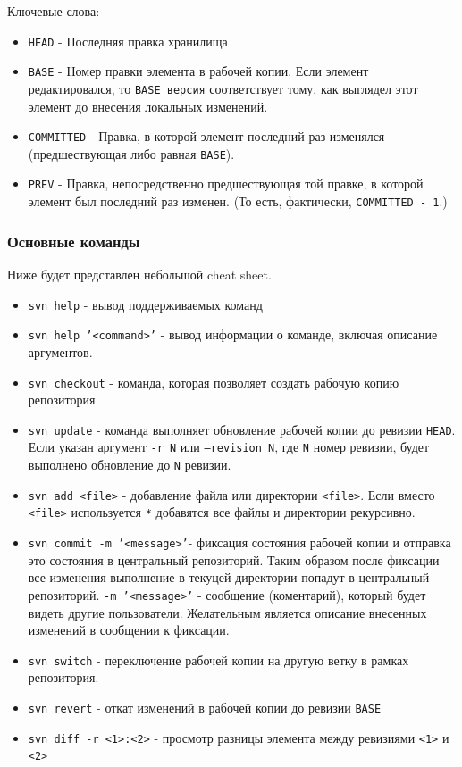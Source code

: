 \documentclass[a4paper,12pt]{article}
\begin{document}
Ключевые слова:

\begin{itemize}
\item
  \texttt{HEAD} - Последняя правка хранилища
\item
  \texttt{BASE} - Номер правки элемента в рабочей копии. Если элемент
  редактировался, то \texttt{BASE версия} соответствует тому, как
  выглядел этот элемент до внесения локальных изменений.
\item
  \texttt{COMMITTED} - Правка, в которой элемент последний раз изменялся
  (предшествующая либо равная \texttt{BASE}).
\item
  \texttt{PREV} - Правка, непосредственно предшествующая той правке, в
  которой элемент был последний раз изменен. (То есть, фактически,
  \texttt{COMMITTED - 1}.)
\end{itemize}
\subsubsection{Основные команды}

Ниже будет представлен небольшой cheat sheet.

\begin{itemize}
\item
  \texttt{svn help} - вывод поддерживаемых команд
\item
  \texttt{svn help '\textless{}command\textgreater{}'} - вывод
  информации о команде, включая описание аргументов.
\item
  \texttt{svn checkout} - команда, которая позволяет создать рабочую
  копию репозитория
\item
  \texttt{svn update} - команда выполняет обновление рабочей копии до
  ревизии \texttt{HEAD}. Если указан аргумент \texttt{-r N} или
  \texttt{--revision N}, где \texttt{N} номер ревизии, будет выполнено
  обновление до \texttt{N} ревизии.
\item
  \texttt{svn add \textless{}file\textgreater{}} - добавление файла или
  директории \texttt{\textless{}file\textgreater{}}. Если вместо
  \texttt{\textless{}file\textgreater{}} используется \texttt{*}
  добавятся все файлы и директории рекурсивно.
\item
  \texttt{svn commit -m '\textless{}message\textgreater{}'}- фиксация
  состояния рабочей копии и отправка это состояния в центральный
  репозиторий. Таким образом после фиксации все изменения выполнение в
  текуцей директории попадут в центральный репозиторий. \texttt{-m
  '\textless{}message\textgreater{}'} -  сообщение (коментарий), который будет
  видеть другие пользователи. Желательным является описание внесенных изменений в сообщении к фиксации.
\item
  \texttt{svn switch} - переключение рабочей копии на другую ветку в
  рамках репозитория.
\item
  \texttt{svn revert} - откат изменений в рабочей копии до ревизии
  \texttt{BASE}
\item
  \texttt{svn diff -r \textless{}1\textgreater{}:\textless{}2\textgreater{}}
  - просмотр разницы элемента между ревизиями
  \texttt{\textless{}1\textgreater{}} и \texttt{\textless{}2\textgreater{}}
\end{itemize}
\end{document}

